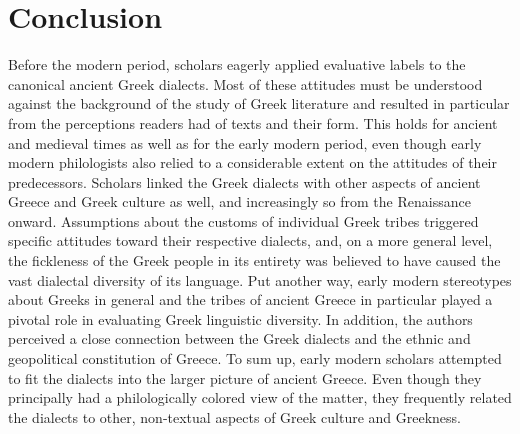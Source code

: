 \section{Conclusion}\label{sec:7.7}


Before the modern period, scholars eagerly applied evaluative labels to the canonical ancient Greek dialects. Most of these attitudes must be understood against the background of the study of Greek literature and resulted in particular from the perceptions readers had of texts and their form. This holds for ancient and medieval times as well as for the early modern period, even though early modern philologists also relied to a considerable extent on the attitudes of their predecessors. Scholars linked the Greek dialects with other aspects of ancient Greece and Greek culture as well, and increasingly so from the Renaissance onward. Assumptions about the customs of individual Greek tribes triggered specific attitudes toward their respective dialects, and, on a more general level, the fickleness of the Greek people in its entirety was believed to have caused the vast dialectal diversity of its language. Put another way, early modern stereotypes about Greeks in general and the tribes of ancient Greece in particular played a pivotal role in evaluating Greek linguistic diversity. In addition, the authors perceived a close connection between the Greek dialects and the ethnic and geopolitical constitution of Greece. To sum up, early modern scholars attempted to fit the dialects into the larger picture of ancient Greece. Even though they principally had a philologically colored view of the matter, they frequently related the dialects to other, non-textual aspects of Greek culture and Greekness.

